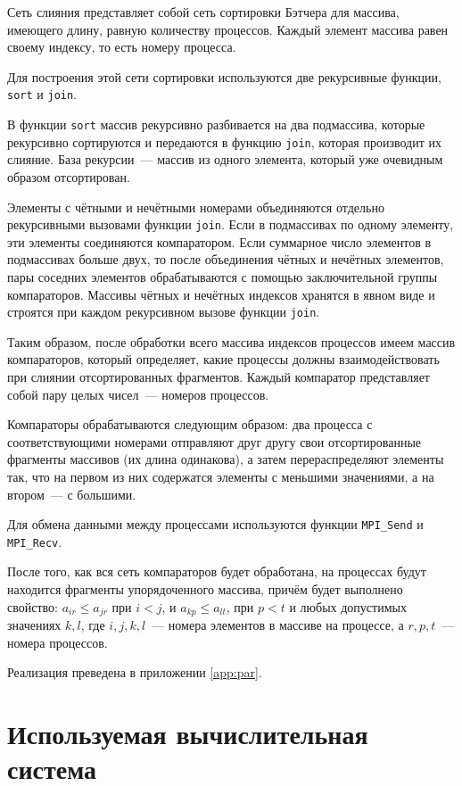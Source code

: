 \documentclass[oneside,final,14pt]{extreport}
\begin{document}
Сеть слияния представляет собой сеть сортировки Бэтчера для массива, имеющего
длину, равную количеству процессов. Каждый элемент массива равен своему индексу,
то есть номеру процесса.

Для построения этой сети сортировки используются две рекурсивные функции,
\texttt{sort} и \texttt{join}.

В функции \texttt{sort} массив рекурсивно разбивается на два подмассива,
которые рекурсивно сортируются и передаются в функцию \texttt{join}, которая
производит их слияние. База рекурсии~--- массив из одного элемента,
который уже очевидным образом отсортирован.

Элементы с чётными и нечётными номерами объединяются отдельно рекурсивными
вызовами функции \texttt{join}. Если в подмассивах по одному элементу,
эти элементы соединяются компаратором. Если суммарное число элементов в
подмассивах больше двух, то после объединения чётных и нечётных элементов,
пары соседних элементов обрабатываются с помощью заключительной
группы компараторов. Массивы чётных и нечётных индексов хранятся в явном виде
и строятся при каждом рекурсивном вызове функции \texttt{join}.

Таким образом, после обработки всего массива индексов процессов имеем
массив компараторов, который определяет, какие процессы должны взаимодействовать
при слиянии отсортированных фрагментов. Каждый компаратор представляет собой
пару целых чисел~--- номеров процессов.

Компараторы обрабатываются следующим образом: два процесса с соответствующими
номерами отправляют друг другу свои отсортированные фрагменты массивов (их
длина одинакова), а затем перераспределяют элементы так, что на первом из
них содержатся элементы с меньшими значениями, а на втором~--- с большими.

Для обмена данными между процессами используются функции \texttt{MPI\_Send}
и \texttt{MPI\_Recv}.

После того, как вся сеть компараторов будет обработана, на процессах
будут находится фрагменты упорядоченного массива, причём будет выполнено
свойство: $a_{ir} \leq a_{jr}$ при $i < j$, и $a_{kp} \leq a_{lt}$, при
$p < t$ и любых допустимых значениях $k, l$, где $i, j, k, l$~--- номера
элементов в массиве на процессе, а $r, p, t$~--- номера процессов.

Реализация преведена в приложении \ref{app:par}.

\chapter*{Используемая вычислительная система}
\end{document}
